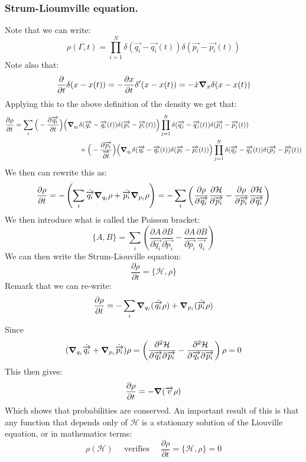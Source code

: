 \documentclass[10pt,a4paper]{book}
\begin{document}
\subsubsection{Strum-Lioumville equation.}
Note that we can write:
\[
\rho(\Gamma, t) = \prod_{i = 1}^N \delta(\overrightarrow{q_i} - \overrightarrow{q_i}(t))\delta(\overrightarrow{p_i} - \overrightarrow{p_i}(t))
\]
Note also that:
\[
\frac{\partial}{\partial t}\delta(x - x(t)) = -\frac{\partial x}{\partial t}\delta'(x - x(t)) = - \dot{x}\grad_x \delta(x - x(t))
\]
Applying this to the above definition of the density we get that:
\begin{align*}
\frac{\partial \rho}{\partial t} = \sum_i \Big(-\frac{\partial \overrightarrow{q_i}}{\partial t} \Big)\Big( \grad_{q_i} &\delta(\overrightarrow{q_i} - \overrightarrow{q_i}(t)) \delta(\overrightarrow{p_i} - \overrightarrow{p_i}(t)) \Big)\prod_{j = 1}^N \delta(\overrightarrow{q_j} - \overrightarrow{q_j}(t))\delta(\overrightarrow{p_j} - \overrightarrow{p_j}(t)) \\
&+ \Big(-\frac{\partial\overrightarrow{p_i}}{\overrightarrow{\partial t}}\Big)\Big( \grad_{q_i} \delta(\overrightarrow{q_i} - \overrightarrow{q_i}(t)) \delta(\overrightarrow{p_i} - \overrightarrow{p_i}(t)) \Big)\prod_{j = 1}^N \delta(\overrightarrow{q_j} - \overrightarrow{q_j}(t))\delta(\overrightarrow{p_j} - \overrightarrow{p_j}(t))
\end{align*}
We then can rewrite this as:
\[
\frac{\partial \rho}{\partial t} = -\left( \sum_i \dot{\overrightarrow{q_i}} \grad_{q_i} \rho + \dot{\overrightarrow{p_i}}\grad_{p_i} \rho\right) = - \sum_i \left(\frac{\partial \rho}{\partial \overrightarrow{q_i}}\frac{\partial \mathcal{H}}{\partial \overrightarrow{p_i}} - \frac{\partial \rho}{\partial \overrightarrow{p_i}}\frac{\partial\mathcal{H}}{\partial \overrightarrow{q_i}}\right)
\]
We then introduce what is called the Poisson bracket:
\[
\{A, B\} = \sum_i \left( \frac{\partial A}{\partial \overrightarrow{q_i}} \frac{\partial B}{\partial \overrightarrow{p_i}} - \frac{\partial A}{\partial \overrightarrow{p_i}} \frac{\partial B}{\overrightarrow{q_i}} \right)
\]
We can then write the Strum-Liouville equation:
\[
\frac{\partial \rho}{\partial t} = \{\mathcal{H}, \rho\}
\]
Remark that we can re-write:
\[
\frac{\partial \rho}{\partial t} = - \sum_i \grad_{q_i}(\dot{\overrightarrow{q_i}} \rho) + \grad_{p_i}(\dot{\overrightarrow{p_i}}\rho)
\]
Since
\[
(\grad_{q_i}\dot{\overrightarrow{q_i}} + \grad_{p_i}\dot{\overrightarrow{p_i}})\rho = \left(\frac{\partial^2 \mathcal{H}}{\partial \overrightarrow{q_i}\partial\overrightarrow{p_i}}  - \frac{\partial^2 \mathcal{H}}{\partial \overrightarrow{q_i}\partial\overrightarrow{p_i}}\right)\rho = 0
\]
This then gives:
\[
\frac{\partial \rho}{\partial t} = - \grad (\overrightarrow{v} \rho)
\]
Which shows that probabilities are conserved. An important result of this is that any function that depends only of $\mathcal{H}$ is a stationary solution of the Liouville equation, or in mathematics terms:
\[
\rho(\mathcal{H}) \quad \text{ verifies } \quad \frac{\partial \rho}{\partial t} = \{\mathcal{H}, \rho\} = 0
\]
\end{document}
